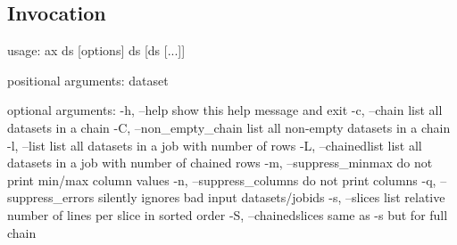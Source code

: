 \subsection{Invocation}
\begin{shell}
  usage: ax ds [options] ds [ds [...]]

  positional arguments:
  dataset

  optional arguments:
  -h, --help              show this help message and exit
  -c, --chain             list all datasets in a chain
  -C, --non_empty_chain   list all non-empty datasets in a chain
  -l, --list              list all datasets in a job with number of rows
  -L, --chainedlist       list all datasets in a job with number of chained rows
  -m, --suppress_minmax   do not print min/max column values
  -n, --suppress_columns  do not print columns
  -q, --suppress_errors   silently ignores bad input datasets/jobids
  -s, --slices            list relative number of lines per slice in sorted
  order
  -S, --chainedslices     same as -s but for full chain
\end{shell}

